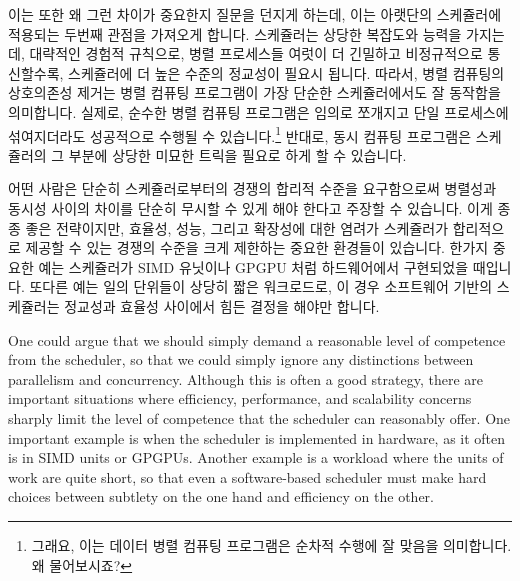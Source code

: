 이는 또한 왜 그런 차이가 중요한지 질문을 던지게 하는데, 이는 아랫단의
스케쥴러에 적용되는 두번째 관점을 가져오게 합니다.
스케쥴러는 상당한 복잡도와 능력을 가지는데, 대략적인 경험적 규칙으로, 병렬
프로세스들 여럿이 더 긴밀하고 비정규적으로 통신할수록, 스케쥴러에 더 높은
수준의 정교성이 필요시 됩니다.
따라서, 병렬 컴퓨팅의 상호의존성 제거는 병렬 컴퓨팅 프로그램이 가장 단순한
스케쥴러에서도 잘 동작함을 의미합니다.
실제로, 순수한 병렬 컴퓨팅 프로그램은 임의로 쪼개지고 단일 프로세스에
섞여지더라도 성공적으로 수행될 수 있습니다.\footnote{
	그래요, 이는 데이터 병렬 컴퓨팅 프로그램은 순차적 수행에 잘 맞음을
	의미합니다.
	왜 물어보시죠?}
반대로, 동시 컴퓨팅 프로그램은 스케쥴러의 그 부분에 상당한 미묘한 트릭을 필요로
하게 할 수 있습니다.

\iffalse

This of course begs the question of why such a distinction matters,
which brings us to the second perspective, that of the underlying scheduler.
Schedulers come in a wide range of complexities and capabilities, and
as a rough rule of thumb, the more tightly and irregularly a set of
parallel processes communicate, the higher the level of sophistication
required from the scheduler.
As such, parallel computing's avoidance of interdependencies means that
parallel-computing programs run well on the least-capable schedulers.
In fact, a pure parallel-computing program can run successfully after
being arbitrarily subdivided and interleaved onto a uniprocessor.\footnote{
	Yes, this does mean that data-parallel-computing programs are
	best-suited for sequential execution.
	Why did you ask?}
In contrast, concurrent-computing programs might well require extreme
subtlety on the part of the scheduler.

\fi

어떤 사람은 단순히 스케쥴러로부터의 경쟁의 합리적 수준을 요구함으로써 병렬성과
동시성 사이의 차이를 단순히 무시할 수 있게 해야 한다고 주장할 수 있습니다.
이게 종종 좋은 전략이지만, 효율성, 성능, 그리고 확장성에 대한 염려가 스케쥴러가
합리적으로 제공할 수 있는 경쟁의 수준을 크게 제한하는 중요한 환경들이 있습니다.
한가지 중요한 예는 스케쥴러가 SIMD 유닛이나 GPGPU 처럼 하드웨어에서 구현되었을
때입니다.
또다른 예는 일의 단위들이 상당히 짧은 워크로드로, 이 경우 소프트웨어 기반의
스케쥴러는 정교성과 효율성 사이에서 힘든 결정을 해야만 합니다.

\iffalse

One could argue that we should simply demand a reasonable level of
competence from the scheduler, so that we could simply ignore any
distinctions between parallelism and concurrency.
Although this is often a good strategy,
there are important situations where efficiency,
performance, and scalability concerns sharply limit the level
of competence that the scheduler can reasonably offer.
One important example is when the scheduler is implemented in
hardware, as it often is in SIMD units or GPGPUs.
Another example is a workload where the units of work are quite
short, so that even a software-based scheduler must make hard choices
between subtlety on the one hand and efficiency on the other.

